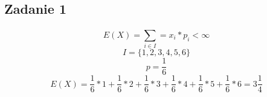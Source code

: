 \subsection{Zadanie 1}

$$ E(X) = \sum_{i \in I}^{} = x_i * p_i < \infty $$
$$ I = \{ 1,2,3,4,5,6 \}$$
$$ p= \frac{1}{6}$$
$$ E(X) = \frac{1}{6} * 1 + \frac{1}{6} * 2 + \frac{1}{6} * 3 + \frac{1}{6} * 4 + \frac{1}{6} * 5 + \frac{1}{6} * 6 = 3\frac{1}{4}$$
